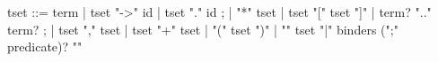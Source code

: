 \begin{syntax}
  tset ::= term | tset "->" id | tset "." id  ;
       | "*" tset | tset "[" tset "]" | term? ".." term? ; 
       | tset "," tset | tset "+" tset
       | "(" tset ")"
       | "{" tset "|" binders (";" predicate)? "}"
\end{syntax}

